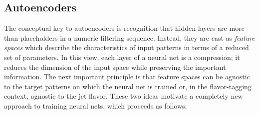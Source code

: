 \subsection{Autoencoders}

The conceptual key to autoencoders is recognition that hidden layers are more than placeholders in a numeric filtering sequence.
Instead, they are cast as \emph{feature spaces} which describe the characteristics of input patterns in terms of a reduced set of parameters.
In this view, each layer of a neural net is a compression; it reduces the dimension of the input space while preserving the important information.
The next important principle is that feature spaces can be agnostic to the target patterns on which the neural net is trained or, in the flavor-tagging context, agnostic to the jet flavor.
These two ideas motivate a completely new approach to training neural nets, which proceeds as follows:

